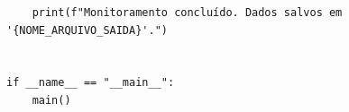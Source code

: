 \begin{anexosenv}
\begin{verbatim}
    print(f"Monitoramento concluído. Dados salvos em '{NOME_ARQUIVO_SAIDA}'.")


if __name__ == "__main__":
    main()
\end{verbatim}


\end{anexosenv}
